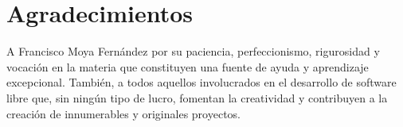 



\chapter*{Agradecimientos}

\thispagestyle{empty} 				%


A Francisco Moya Fernández por su paciencia, perfeccionismo, rigurosidad y vocación en la materia que constituyen una fuente de ayuda y aprendizaje excepcional. También, a todos aquellos involucrados en el desarrollo de software libre que, sin ningún tipo de lucro, fomentan la creatividad y contribuyen a la creación de innumerables y originales proyectos.

\cleardoublepage
